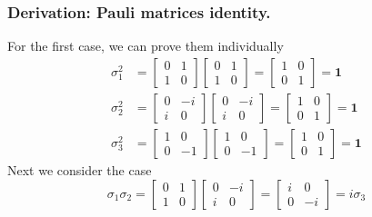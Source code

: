 \documentclass[../../../main.tex]{subfiles}
\begin{document}
\subsubsection{Derivation: Pauli matrices identity.}
For the first case, we can prove them individually
\begin{align*}
    \sigma_1^2 & =
    \begin{bmatrix}
        0 & 1 \\
        1 & 0
    \end{bmatrix}
    \begin{bmatrix}
        0 & 1 \\
        1 & 0
    \end{bmatrix}
    =
    \begin{bmatrix}
        1 & 0 \\
        0 & 1
    \end{bmatrix}
    = \mathbf{1}   \\
    \sigma_2^2 & =
    \begin{bmatrix}
        0 & -i \\
        i & 0
    \end{bmatrix}
    \begin{bmatrix}
        0 & -i \\
        i & 0
    \end{bmatrix}
    =
    \begin{bmatrix}
        1 & 0 \\
        0 & 1
    \end{bmatrix}
    = \mathbf{1}   \\
    \sigma_3^2 & =
    \begin{bmatrix}
        1 & 0  \\
        0 & -1
    \end{bmatrix}
    \begin{bmatrix}
        1 & 0  \\
        0 & -1
    \end{bmatrix}
    =
    \begin{bmatrix}
        1 & 0 \\
        0 & 1
    \end{bmatrix}
    = \mathbf{1}
\end{align*}
Next we consider the case
\begin{equation*}
    \sigma_1 \sigma_2 = \begin{bmatrix} 0 & 1 \\ 1 & 0 \end{bmatrix} \begin{bmatrix} 0 & -i \\ i & 0 \end{bmatrix} = \begin{bmatrix} i & 0 \\ 0 & -i \end{bmatrix} = i \sigma_3
\end{equation*}
\end{document}

